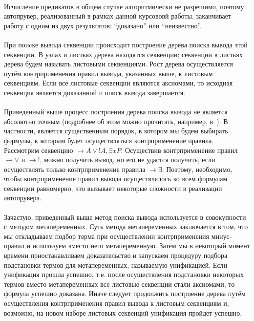 \documentclass{cw1}
\begin{document}
\paragraph{}
Исчисление предикатов в общем случае алгоритмически не разрешимо, поэтому автопрувер,
реализованный в рамках данной курсововй работы,
заканчивает работу с одним из двух результатов: ``доказано'' или ``неизвестно''.

\paragraph{}
При поиcке вывода секвенции происходит построение дерева поиска вывода этой секвенции. В узлах и
листьях дерева находятся секвенции; секвенции в листьях дерева будем называть листовыми
секвенциями. Рост дерева осуществляется путём контрприменения правил вывода, указанных выше, к
листовым
секвенциям. Если все листовые секвенции являются аксиомами, то исходная секвенция является
доказанной и поиск вывода завершается.
\paragraph{}
Приведенный выше процесс построения дерева поиска вывода не является абсолютно точным (подробнее
об этом можно прочитать, например, в~\cite{gerasimov}). В частности, является существенным порядок, в котором
мы будем выбирать формулы, к которым будет осуществляться контрприменение правила. Рассмотрим
секвенцию $\rightarrow A \vee !A, \exists x P$. Осуществив контрприменение правил $\rightarrow \vee$ и
$\rightarrow !$, можно получить вывод, но его не удастся получить, если осуществлять
только контрприменение правила $\rightarrow \exists$.
Поэтому, необходимо, чтобы контрприменение правил вывода осуществлялось ко всем
формулам секвенции равномерно, что вызывает некоторые сложности в реализации автопрувера.

\paragraph{}
Зачастую, приведенный выше метод поиска вывода используется в совокупности с методом метапеременных.
Суть метода метапеременных заключается
в том, что мы откладываем подбор терма при осуществлении контрприменения минус-правил
и используем вместо него метапеременную. Затем мы в некоторый момент времени
приостанавливаем доказательство и запускаем процедуру подбора подстановки термов для метапеременных,
называемую унификацией. Если унификация прошла успешно, т.е. после осуществления подстановки
некоторых термов вместо метапеременных все листовые секвенции стали аксиомами, то формула
успешно доказана. Иначе следует продолжить построение дерева путём осуществления контрприменения
правил вывода к листовым секвенциям и, возможно, на новом наборе листовых секвенций унификация
пройдет успешно. 
\end{document}
